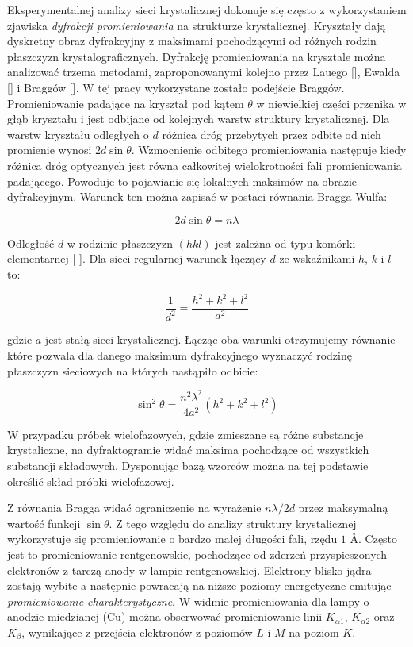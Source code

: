 \documentclass[polish,]{article}
\begin{document}
Eksperymentalnej analizy sieci krystalicznej dokonuje się często z
wykorzystaniem zjawiska \emph{dyfrakcji promieniowania} na strukturze
krystalicznej. Kryształy dają dyskretny obraz dyfrakcyjny z maksimami
pochodzącymi od różnych rodzin płaszczyzn krystalograficznych. Dyfrakcję
promieniowania na krysztale można analizować trzema metodami,
zaproponowanymi kolejno przez Lauego {[}{]}, Ewalda {[}{]} i Braggów
{[}{]}. W tej pracy wykorzystane zostało podejście Braggów.
Promieniowanie padające na kryształ pod kątem \(\theta\) w niewielkiej
części przenika w głąb kryształu i jest odbijane od kolejnych warstw
struktury krystalicznej. Dla warstw kryształu odległych o \(d\) różnica
dróg przebytych przez odbite od nich promienie wynosi
\(2d \sin \theta\). Wzmocnienie odbitego promieniowania następuje kiedy
różnica dróg optycznych jest równa całkowitej wielokrotności fali
promieniowania padającego. Powoduje to pojawianie się lokalnych maksimów
na obrazie dyfrakcyjnym. Warunek ten można zapisać w postaci równania
Bragga-Wulfa:

\begin{equation} 2d \sin \theta = n \lambda \label{eq:bragg}\end{equation}

Odległość \(d\) w rodzinie płaszczyzn \((hkl)\) jest zależna od typu
komórki elementarnej {[} {]}. Dla sieci regularnej warunek łączący \(d\)
ze wskaźnikami \(h\), \(k\) i \(l\) to:

\begin{equation} \frac{1}{d^2} = \frac{h^2 + k^2 + l^2}{a^2} \label{eq:dinhkl}\end{equation}

gdzie \(a\) jest stałą sieci krystalicznej. Łącząc oba warunki
otrzymujemy równanie które pozwala dla danego maksimum dyfrakcyjnego
wyznaczyć rodzinę płaszczyzn sieciowych na których nastąpiło odbicie:

\begin{equation} \sin^2 \theta = \frac{n^2\lambda^2}{4a^2}(h^2 + k^2 + l^2) \label{eq:quadratic}\end{equation}

W przypadku próbek wielofazowych, gdzie zmieszane są różne substancje
krystaliczne, na dyfraktogramie widać maksima pochodzące od wszystkich
substancji składowych. Dysponując bazą wzorców można na tej podstawie
określić skład próbki wielofazowej.

Z równania Bragga widać ograniczenie na wyrażenie \(n\lambda/2d\) przez
maksymalną wartość funkcji \(\sin\theta\). Z tego względu do analizy
struktury krystalicznej wykorzystuje się promieniowanie o bardzo małej
długości fali, rzędu \(1\) \AA. Często jest to promieniowanie
rentgenowskie, pochodzące od zderzeń przyspieszonych elektronów z tarczą
anody w lampie rentgenowskiej. Elektrony blisko jądra zostają wybite a
następnie powracają na niższe poziomy energetyczne emitując
\emph{promieniowanie charakterystyczne}. W widmie promieniowania dla
lampy o anodzie miedzianej (Cu) można obserwować promieniowanie linii
\(K_{\alpha1}\), \(K_{\alpha2}\) oraz \(K_{\beta}\), wynikające z
przejścia elektronów z poziomów \(L\) i \(M\) na poziom \(K\).
\end{document}
